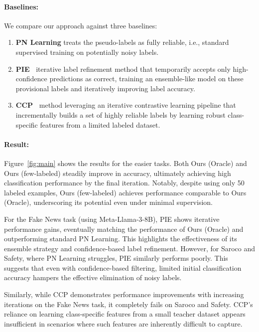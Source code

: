 \paragraph{Baselines:}
We compare our approach against three baselines:
\begin{enumerate}
\item \textbf{PN Learning} treats the pseudo-labels as fully reliable, i.e., standard supervised training on potentially noisy labels.
\item \textbf{PIE~\citep{Zhang2023-zo}} iterative label refinement method that temporarily accepts only high-confidence predictions as correct, training an ensemble-like model on these provisional labels and iteratively improving label accuracy.
\item \textbf{CCP~\citep{kutt2024contrastive}} method leveraging an iterative contrastive learning pipeline that incrementally builds a set of highly reliable labels by learning robust class-specific features from a limited labeled dataset.
\end{enumerate}

\paragraph{Result:}
Figure~\ref{fig:main} shows the results for the easier tasks. Both Ours (Oracle) and Ours (few-labeled) steadily improve in accuracy, ultimately achieving high classification performance by the final iteration. Notably, despite using only 50 labeled examples, Ours (few-labeled) achieves performance comparable to Ours (Oracle), underscoring its potential even under minimal supervision.

For the Fake News task (using Meta-Llama-3-8B), PIE shows iterative performance gains, eventually matching the performance of Ours (Oracle) and outperforming standard PN Learning. This highlights the effectiveness of its ensemble strategy and confidence-based label refinement. However, for Saroco and Safety, where PN Learning struggles, PIE similarly performs poorly. This suggests that even with confidence-based filtering, limited initial classification accuracy hampers the effective elimination of noisy labels.

Similarly, while CCP demonstrates performance improvements with increasing iterations on the Fake News task, it completely fails on Saroco and Safety. CCP's reliance on learning class-specific features from a small teacher dataset appears insufficient in scenarios where such features are inherently difficult to capture.

